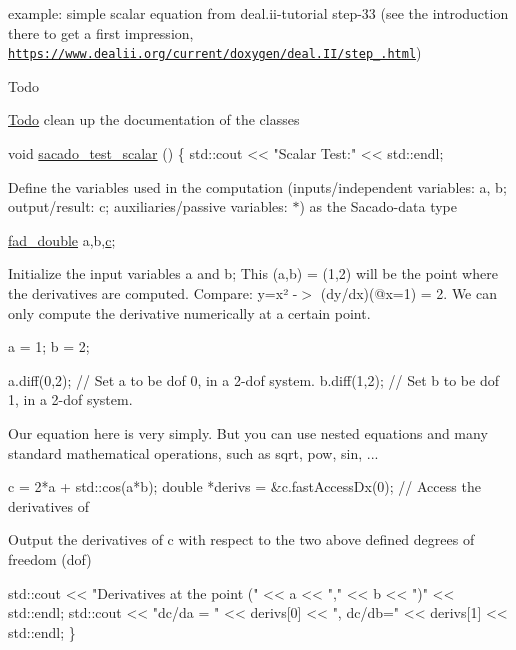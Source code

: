 \begin{DoxyEnumerate}
\item example\+: simple scalar equation from deal.\+ii-\/tutorial step-\/33 (see the introduction there to get a first impression, \href{https://www.dealii.org/current/doxygen/deal.II/step_33.html}{\tt https\+://www.\+dealii.\+org/current/doxygen/deal.\+I\+I/step\+\_.\+html}) \begin{DoxyRefDesc}{Todo}
\item[\hyperlink{todo__todo000003}{Todo}]clean up the documentation of the classes\end{DoxyRefDesc}

\end{DoxyEnumerate}


\begin{DoxyCode}
\textcolor{keywordtype}{void} \hyperlink{Sacado__example_8cc_a71b2675e62203edc430e7ffc8a365193}{sacado\_test\_scalar} ()
\{
    std::cout << \textcolor{stringliteral}{"Scalar Test:"} << std::endl;
\end{DoxyCode}
 Define the variables used in the computation (inputs/independent variables\+: a, b; output/result\+: c; auxiliaries/passive variables\+: $\ast$) as the Sacado-\/data type 
\begin{DoxyCode}
\hyperlink{Sacado__example_8cc_a868b94676739e612d9c95940e70892a9}{fad\_double} a,b,\hyperlink{CMakeCache_8txt_aac1d6a1710812201527c735f7c6afbaa}{c};
\end{DoxyCode}
 Initialize the input variables a and b; This (a,b) = (1,2) will be the point where the derivatives are computed. Compare\+: y=x² -\/$>$ (dy/dx)(@x=1) = 2. We can only compute the derivative numerically at a certain point. 
\begin{DoxyCode}
 a = 1;
 b = 2;

a.diff(0,2);  \textcolor{comment}{// Set a to be dof 0, in a 2-dof system.}
b.diff(1,2);  \textcolor{comment}{// Set b to be dof 1, in a 2-dof system.}
\end{DoxyCode}
 Our equation here is very simply. But you can use nested equations and many standard mathematical operations, such as sqrt, pow, sin, ... 
\begin{DoxyCode}
c = 2*a + std::cos(a*b);
\textcolor{keywordtype}{double} *derivs = &c.fastAccessDx(0); \textcolor{comment}{// Access the derivatives of}
\end{DoxyCode}
 Output the derivatives of c with respect to the two above defined degrees of freedom (dof) 
\begin{DoxyCode}
    std::cout << \textcolor{stringliteral}{"Derivatives at the point ("} << a << \textcolor{stringliteral}{","} << b << \textcolor{stringliteral}{")"} << std::endl;
    std::cout << \textcolor{stringliteral}{"dc/da = "} << derivs[0] << \textcolor{stringliteral}{", dc/db="} << derivs[1] << std::endl;
\}
\end{DoxyCode}
